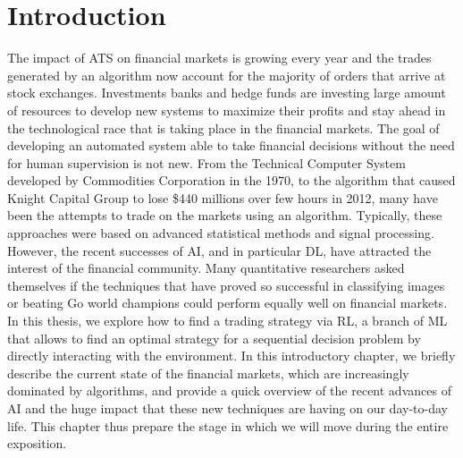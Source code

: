 \chapter{Introduction}

The impact of \gls{ATS} on financial markets is growing every year and the trades generated by an algorithm now account for the majority of orders that arrive at stock exchanges. Investments banks and hedge funds are investing large amount of resources to develop new systems to maximize their profits and stay ahead in the technological race that is taking place in the financial markets. The goal of developing an automated system able to take financial decisions without the need for human supervision is not new. From the Technical Computer System developed by Commodities Corporation in the 1970, to the algorithm that caused Knight Capital Group to lose \$440 millions over few hours in 2012, many have been the attempts to trade on the markets using an algorithm. Typically, these approaches were based on advanced statistical methods and signal processing. However, the recent successes of \gls{AI}, and in particular \gls{DL}, have attracted the interest of the financial community. Many quantitative researchers asked themselves if the techniques that have proved so successful in classifying images or beating Go world champions could perform equally well on financial markets. In this thesis, we explore how to find a trading strategy via \gls{RL}, a branch of \gls{ML} that allows to find an optimal strategy for a sequential decision problem by directly interacting with the environment. In this introductory chapter, we briefly describe the current state of the financial markets, which are increasingly dominated by algorithms, and provide a quick overview of the recent advances of \gls{AI} and the huge impact that these new techniques are having on our day-to-day life. This chapter thus prepare the stage in which we will move during the entire exposition. 

